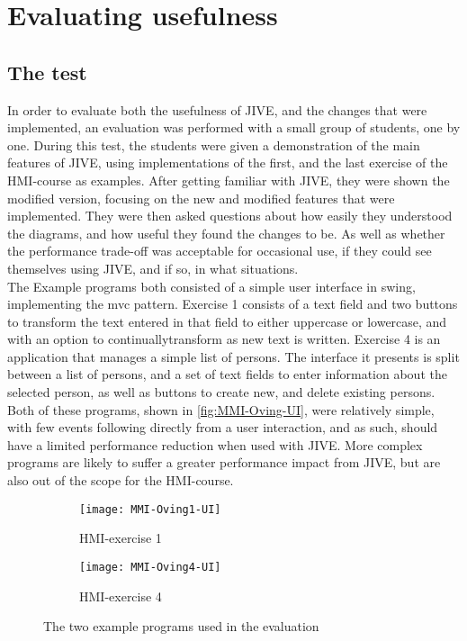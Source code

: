 \chapter{Evaluating usefulness}\label{jiveEval}
\section{The test}\label{jiveEvalTest}%
In order to evaluate both the usefulness of JIVE, and the changes that were implemented, an evaluation was performed with a small group of students, one by one.
During this test, the students were given a demonstration of the main features of JIVE, using implementations of the first, and the last exercise of the HMI-course as examples.
After getting familiar with JIVE, they were shown the modified version, focusing on the new and modified features that were implemented.
They were then asked questions about how easily they understood the diagrams, and how useful they found the changes to be.
As well as whether the performance trade-off was acceptable for occasional use, if they could see themselves using JIVE, and if so, in what situations.
~\\

The Example programs both consisted of a simple user interface in swing, implementing the \gls{mvc} pattern.
Exercise 1 consists of a text field and two buttons to transform the text entered in that field to either uppercase or lowercase, and with an option to continuallytransform as new text is written.
Exercise 4 is an application that manages a simple list of persons.
The interface it presents is split between a list of persons, and a set of text fields to enter information about the selected person, as well as buttons to create new, and delete existing persons.
Both of these programs, shown in \autoref{fig:MMI-Oving-UI}, were relatively simple, with few events following directly from a user interaction, and as such, should have a limited performance reduction when used with JIVE.
More complex programs are likely to suffer a greater performance impact from JIVE, but are also out of the scope for the HMI-course.
~\\

\begin{figure}[H]
	\centering
	\begin{subfigure}{\textwidth}
		\centering
		\texttt{[image: MMI-Oving1-UI]}
		\caption{HMI-exercise 1}
		\label{fig:MMI-Oving1-UI}
	\end{subfigure}
	\begin{subfigure}{\textwidth}
		\centering
		\texttt{[image: MMI-Oving4-UI]}
		\caption{HMI-exercise 4}
		\label{fig:MMI-Oving4-UI}
	\end{subfigure}
	\caption{The two example programs used in the evaluation}
	\label{fig:MMI-Oving-UI}
\end{figure}


